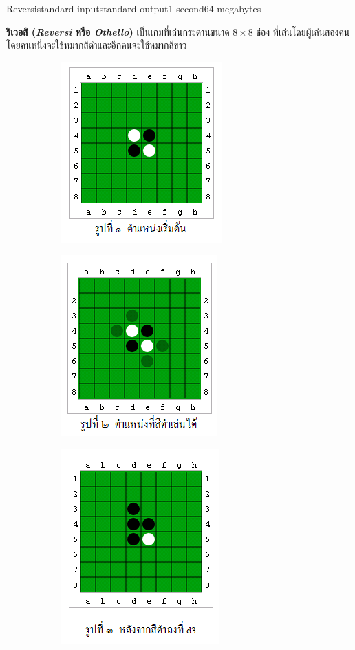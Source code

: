 \documentclass[11pt,a4paper]{article}
\begin{document}
\begin{problem}{Reversi}{standard input}{standard output}{1 second}{64 megabytes}

\textbf{ริเวอสิ (\textit{Reversi} หรือ \textit{Othello})} เป็นเกมที่เล่นกระดานขนาด $8\times 8$ ช่อง ที่เล่นโดยผู้เล่นสองคน โดยคนหนึ่งจะใช้หมากสีดำและอีกคนจะใช้หมากสีขาว 

\begin{figure}[h]
\begin{subfigure}{30ex}
\centering
\includegraphics[width=25ex]{../latex/img/1034/1034-1.png}
\end{subfigure}%
\begin{subfigure}{30ex}
\centering
\includegraphics[width=25ex]{../latex/img/1034/1034-2.png}
\end{subfigure}%
\begin{subfigure}{30ex}
\centering
\includegraphics[width=25ex]{../latex/img/1034/1034-3.png}
\end{subfigure}%

\end{figure}
\end{problem}
\end{document}
